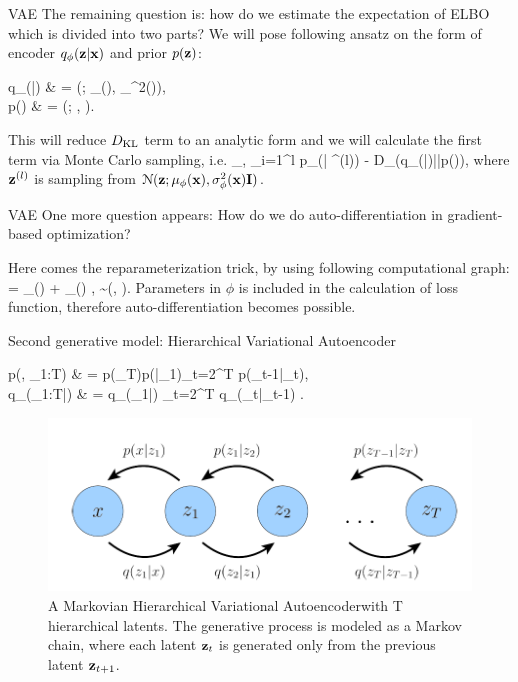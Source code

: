 \documentclass{beamer}
\begin{document}
\begin{frame}{VAE}
	The remaining question is: how do we estimate the expectation of ELBO which is divided into two parts?
	 We will pose following ansatz on the form of encoder $q_{\phi}(\mathbf{z}|\mathbf{x})$ and prior $p(\mathbf{z})$:
	\bequn
		\begin{aligned}
			q_{\phi}(\mfz|\mfx) & = \mcN(\mfz; \mu_{\phi}(\mfx), \sigma_{\phi}^2(\mfx)\mfI), 			\\
			p(\mfz) & = \mcN(\mfz; , \mfI).
		\end{aligned}
	\eequn
	This will reduce $D_{\operatorname{KL}}$ term to an analytic form and we will calculate the first term via Monte Carlo sampling, i.e.
	\bequn
		\arg\max_{\phi, \theta} \sum_{i=1}^l \log p_{\theta}(\mfx| \mfz^{(l)}) - D_{\KL}(q_{\phi}(\mfz|\mfx)||p(\mfz)),
	\eequn
	where $\mathbf{z}^{(l)}$ is sampling from $\mathcal{N}(\mathbf{z}; \mu_{\phi}(\mathbf{x}), \sigma_{\phi}^2(\mathbf{x})\mathbf{I})$.
\end{frame}


\begin{frame}{VAE}
	One more question appears: How do we do auto-differentiation in gradient-based optimization?
	
	Here comes the reparameterization trick, by using following computational graph:
	\bequn
		\mfz = \mu_{\phi}(\mfx) + \sigma_{\phi}(\mfx) \odot \epsilon, \quad \epsilon\sim \mcN(, \mfI).
	\eequn
	Parameters in $\phi$ is included in the calculation of loss function, therefore auto-differentiation becomes possible.
\end{frame}


\begin{frame}{Second generative model: Hierarchical Variational Autoencoder}
\bequn
	\begin{aligned}
	p(\mfx, \mfz_{1:T}) & = p(\mfz_T)p(\mfx|\mfz_1)\prod_{t=2}^T p(\mfz_{t-1}|\mfz_t), 		\\
	q_{\phi}(\mfz_{1:T}|\mfx) & = q_{\phi}(\mfz_1|\mfx) \prod_{t=2}^T q_{\phi}(\mfz_{t}|\mfz_{t-1}) .
	\end{aligned}
\eequn
\begin{figure}[H]
          \centering
          \centerline{\includegraphics[width=0.6\linewidth]{fig/HVAE.png}}
          \caption{A Markovian Hierarchical Variational Autoencoder\footnotemark with T hierarchical latents. The generative process is modeled as a Markov chain, where each latent $\mathbf{z}_t$ is generated only from the previous latent $\mathbf{z}_{t+1}$.}
        \end{figure}
\end{frame}
\end{document}

